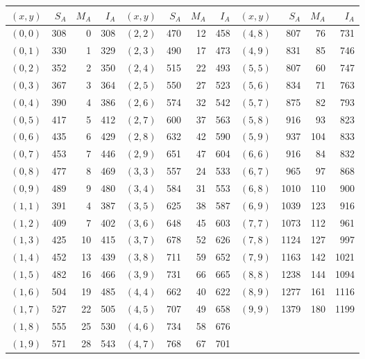 \documentclass[11pt,a4paper]{article}
\theoremstyle{remark}
\begin{document}
\begin{center}
\small
\begin{tabular}{crrr@{\quad}crrr@{\quad}crrr}
\toprule
$(x,y)$ & $S_A$ & $M_A$ & $I_A$ & $(x,y)$ & $S_A$ & $M_A$ & $I_A$ &
$(x,y)$ & $S_A$ & $M_A$ & $I_A$\\
\midrule
$(0,0)$ & 308 & 0 & 308 & $(2,2)$ & 470 & 12 & 458 & $(4,8)$ & 807 & 76 & 731 \\
$(0,1)$ & 330 & 1 & 329 & $(2,3)$ & 490 & 17 & 473 & $(4,9)$ & 831 & 85 & 746 \\
$(0,2)$ & 352 & 2 & 350 & $(2,4)$ & 515 & 22 & 493 & $(5,5)$ & 807 & 60 & 747 \\
$(0,3)$ & 367 & 3 & 364 & $(2,5)$ & 550 & 27 & 523 & $(5,6)$ & 834 & 71 & 763 \\
$(0,4)$ & 390 & 4 & 386 & $(2,6)$ & 574 & 32 & 542 & $(5,7)$ & 875 & 82 & 793 \\
$(0,5)$ & 417 & 5 & 412 & $(2,7)$ & 600 & 37 & 563 & $(5,8)$ & 916 & 93 & 823 \\
$(0,6)$ & 435 & 6 & 429 & $(2,8)$ & 632 & 42 & 590 & $(5,9)$ & 937 & 104 & 833 \\
$(0,7)$ & 453 & 7 & 446 & $(2,9)$ & 651 & 47 & 604 & $(6,6)$ & 916 & 84 & 832 \\
$(0,8)$ & 477 & 8 & 469 & $(3,3)$ & 557 & 24 & 533 & $(6,7)$ & 965 & 97 & 868 \\
$(0,9)$ & 489 & 9 & 480 & $(3,4)$ & 584 & 31 & 553 & $(6,8)$ & 1010 & 110 & 900 \\
$(1,1)$ & 391 & 4 & 387 & $(3,5)$ & 625 & 38 & 587 & $(6,9)$ & 1039 & 123 & 916 \\
$(1,2)$ & 409 & 7 & 402 & $(3,6)$ & 648 & 45 & 603 & $(7,7)$ & 1073 & 112 & 961 \\
$(1,3)$ & 425 & 10 & 415 & $(3,7)$ & 678 & 52 & 626 & $(7,8)$ & 1124 & 127 & 997 \\
$(1,4)$ & 452 & 13 & 439 & $(3,8)$ & 711 & 59 & 652 & $(7,9)$ & 1163 & 142 & 1021 \\
$(1,5)$ & 482 & 16 & 466 & $(3,9)$ & 731 & 66 & 665 & $(8,8)$ & 1238 & 144 & 1094 \\
$(1,6)$ & 504 & 19 & 485 & $(4,4)$ & 662 & 40 & 622 & $(8,9)$ & 1277 & 161 & 1116 \\
$(1,7)$ & 527 & 22 & 505 & $(4,5)$ & 707 & 49 & 658 & $(9,9)$ & 1379 & 180 & 1199 \\
$(1,8)$ & 555 & 25 & 530 & $(4,6)$ & 734 & 58 & 676 & & & & \\
$(1,9)$ & 571 & 28 & 543 & $(4,7)$ & 768 & 67 & 701 & & & & \\
\bottomrule
\end{tabular}
\end{center}
\end{document}
